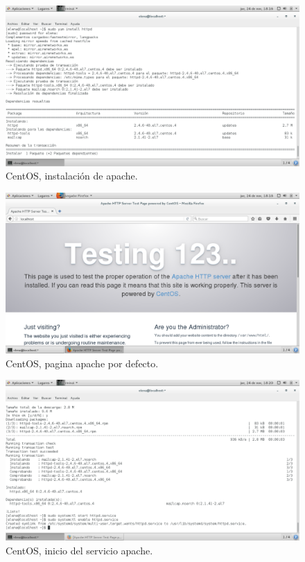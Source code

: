 \begin{figure}[H] 
	\centering
	\includegraphics[width=15cm]{./img/ejercicio9_1.png} 	
	\caption{CentOS, instalación de apache.} \label{fig:ejercicio9_1}
\end{figure}


\begin{figure}[H] 
	\centering
	\includegraphics[width=15cm]{./img/ejercicio9_3.png} 	
	\caption{CentOS, pagina apache por defecto.} \label{fig:ejercicio9_3}
\end{figure}

\begin{figure}[H] 
	\centering
	\includegraphics[width=15cm]{./img/ejercicio9_4.png} 	
	\caption{CentOS, inicio del servicio apache.} \label{fig:ejercicio9_4}
\end{figure}


